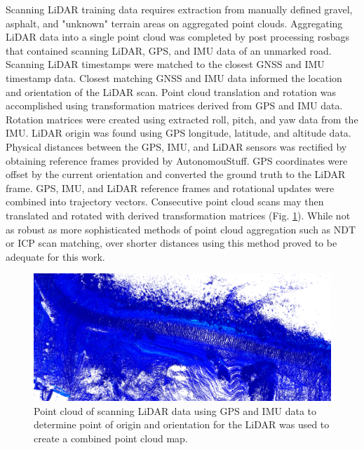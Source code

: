 \documentclass[journal,onecolumn]{IEEEtran}
\begin{document}
			{Scanning LiDAR training data requires extraction from manually defined gravel, asphalt, and "unknown" terrain areas on aggregated point clouds. Aggregating LiDAR data into a single point cloud was completed by post processing rosbags that contained scanning LiDAR, GPS, and IMU data of an unmarked road. Scanning LiDAR timestamps were matched to the closest GNSS and IMU timestamp data. Closest matching GNSS and IMU data informed the location and orientation of the LiDAR scan. Point cloud translation and rotation was accomplished using transformation matrices derived from GPS and IMU data. Rotation matrices were created using extracted roll, pitch, and yaw data from the IMU. LiDAR origin was found using GPS longitude, latitude, and altitude data. Physical distances between the GPS, IMU, and LiDAR sensors was rectified by obtaining reference frames provided by AutonomouStuff. GPS coordinates were offset by the current orientation and converted the ground truth to the LiDAR frame. GPS, IMU, and LiDAR reference frames and rotational updates were combined into trajectory vectors. Consecutive point cloud scans may then translated and rotated with derived transformation matrices (Fig. \ref{fig:pc_example}). While not as robust as more sophisticated methods of point cloud aggregation such as NDT or ICP scan matching, over shorter distances using this method proved to be adequate for this work.}
			

			
			\begin{figure}[H]
				\centering
				\includegraphics[width=0.75\linewidth]{figures/pc_example}
				\caption[Aggregated Point Cloud Data]{Point cloud of scanning LiDAR data using GPS and IMU data to determine point of origin and orientation for the LiDAR was used to create a combined point cloud map.}
				\label{fig:pc_example}
			\end{figure}
		
\end{document}
